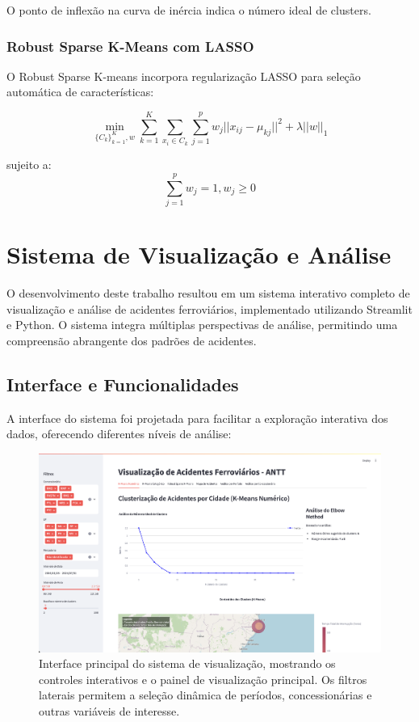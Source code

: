 \documentclass[conference]{IEEEtran}
\begin{document}
O ponto de inflexão na curva de inércia indica o número ideal de clusters.

\subsubsection{Robust Sparse K-Means com LASSO}
O Robust Sparse K-means \cite{b2} incorpora regularização LASSO para seleção automática de características:

\begin{equation}
\min_{\{C_k\}_{k=1}^K, w} \sum_{k=1}^K \sum_{x_i \in C_k} \sum_{j=1}^p w_j||x_{ij} - \mu_{kj}||^2 + \lambda||w||_1
\end{equation}

sujeito a:
\begin{equation}
\sum_{j=1}^p w_j = 1, w_j \geq 0
\end{equation}

\section{Sistema de Visualização e Análise}

O desenvolvimento deste trabalho resultou em um sistema interativo completo de visualização e análise de acidentes ferroviários, implementado utilizando Streamlit e Python. O sistema integra múltiplas perspectivas de análise, permitindo uma compreensão abrangente dos padrões de acidentes.

\subsection{Interface e Funcionalidades}

A interface do sistema foi projetada para facilitar a exploração interativa dos dados, oferecendo diferentes níveis de análise:

\begin{figure}[!htb]
    \centering
    \includegraphics[width=0.9\linewidth]{sistema_interface.png}
    \caption{Interface principal do sistema de visualização, mostrando os controles interativos e o painel de visualização principal. Os filtros laterais permitem a seleção dinâmica de períodos, concessionárias e outras variáveis de interesse.}
    \label{fig:sistema_interface}
\end{figure}
\end{document}

